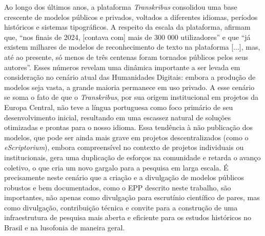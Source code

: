 \documentclass[portuguese]{textolivre}
\begin{document}
Ao longo dos últimos anos, a plataforma \textit{Transkribus} consolidou uma base crescente de modelos públicos e privados, voltados a diferentes idiomas, períodos históricos e sistemas tipográficos. A respeito da escala da plataforma, \textcite[p.~236]{baudry2023humanidades} afirmam que, “nos finais de 2024, [contava com] mais de 300 000 utilizadores” e que “já existem milhares de modelos de reconhecimento de texto na plataforma [...], mas, até ao presente, só menos de três centenas foram tornados públicos pelos seus autores”. Esses números revelam uma dinâmica importante a ser levada em consideração no cenário atual das Humanidades Digitais: embora a produção de modelos seja vasta, a grande maioria permanece em uso privado. A esse cenário se soma o fato de que o \textit{Transkribus}, por sua origem institucional em projetos da Europa Central, não teve a língua portuguesa como foco primário de seu desenvolvimento inicial, resultando em uma escassez natural de soluções otimizadas e prontas para o nosso idioma. Essa tendência à não publicação dos modelos, que pode ser ainda mais grave em projetos descentralizados (como o \textit{eScriptorium}), embora compreensível no contexto de projetos individuais ou institucionais, gera uma duplicação de esforços na comunidade e retarda o avanço coletivo, o que cria um novo gargalo para a pesquisa em larga escala. É precisamente neste cenário que a criação e a divulgação de modelos públicos robustos e bem documentados, como o EPP descrito neste trabalho, são importantes, não apenas como divulgação para escrutínio científico de pares, mas como divulgação, contribuição técnica e convite para a construção de uma infraestrutura de pesquisa mais aberta e eficiente para os estudos históricos no Brasil e na lusofonia de maneira geral.
\end{document}
